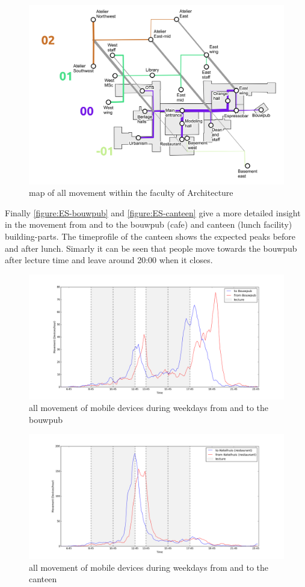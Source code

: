 \begin{figure}[H]
\centering
\includegraphics[scale=0.4]{bk_map_total.png}
\captionsetup{justification=centering}
\caption{map of all movement within the faculty of Architecture}
\label{figure:ES-buildingpartAllMap}
\end{figure}

Finally \autoref{figure:ES-bouwpub} and \autoref{figure:ES-canteen} give a more detailed insight in the movement from and to the bouwpub (cafe) and canteen (lunch facility) building-parts. The timeprofile of the canteen shows the expected peaks before and after lunch. Simarly it can be seen that people move towards the bouwpub after lecture time and leave around 20:00 when it closes. 

\begin{figure}[H]
\centering
\includegraphics[scale=0.2]{buildingpart_fromTo_bouwpubGraph.png}
\captionsetup{justification=centering}
\caption{all movement of mobile devices during weekdays from and to the bouwpub}
\label{figure:ES-bouwpub}
\end{figure}

\begin{figure}[H]
\centering
\includegraphics[scale=0.2]{buildingpart_fromTo_canteenGraph.png}
\captionsetup{justification=centering}
\caption{all movement of mobile devices during weekdays from and to the canteen}
\label{figure:ES-canteen}
\end{figure}
